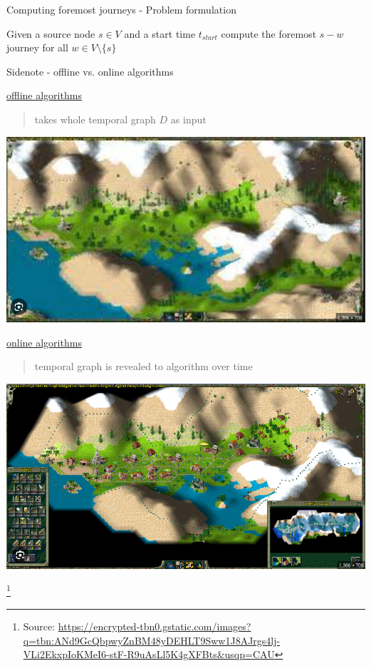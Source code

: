 \documentclass{beamer}
\newcommand{\sourcefootnote}[1]{\let\thefootnote\relax\footnote{{\tiny Source: \url{#1}}}}
\begin{document}
\begin{frame}{Computing foremost journeys - Problem formulation}
  \begin{center}
    Given a source node $s \in V$ and a start time $t_{start}$ compute the foremost $s-w$ journey for all $w \in V \text{\textbackslash{}} \{ s \}$
  \end{center}
\end{frame}

\begin{frame}{Sidenote - offline vs. online algorithms}
  \begin{minipage}{0.45\textwidth}
    \underline{offline algorithms}
    \begin{quote}
      takes whole temporal graph $D$ as input\\
    \end{quote}
    \includegraphics[width=\linewidth]{media/offline_algorithm.png}
  \end{minipage} \hfill 
  \begin{minipage}{0.45\textwidth}
    \underline{online algorithms}
    \begin{quote}
    temporal graph is revealed to algorithm over time
    \end{quote}
    \includegraphics[width=\linewidth]{media/online_algo.png}
  \end{minipage}
  \sourcefootnote{https://encrypted-tbn0.gstatic.com/images?q=tbn:ANd9GcQbpwyZnBM48yDEHLT9Sww1J8AJrgs4lj-VLi2EkxpIoKMeI6-stF-R9uAsLl5K4gXFBts&usqp=CAU}
\end{frame}
\end{document}
